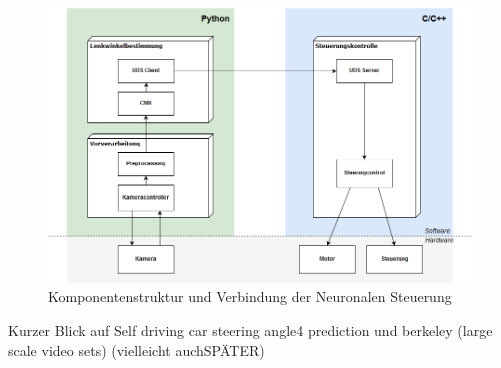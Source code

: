 \begin{figure}[h]
	\centering
	\includegraphics[width=\linewidth]{figures/Steuerung.png}
	\caption{Komponentenstruktur und Verbindung der Neuronalen Steuerung}
	\label{fig:steuerung}
\end{figure}








Kurzer Blick auf  Self driving car steering angle4 prediction und berkeley (large scale video sets) (vielleicht auchSPÄTER)

